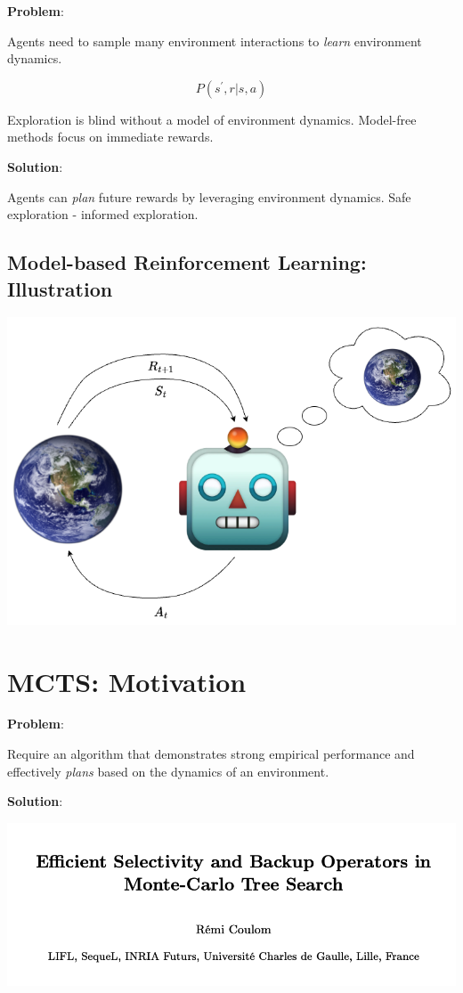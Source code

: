 \documentclass[
  letterpaper,
  DIV=11,
  numbers=noendperiod]{scrreprt}
\begin{document}
\textbf{Problem}:

Agents need to sample many environment interactions to \emph{learn}
environment dynamics.

\[
P(s^{'}, r| s, a)
\]

Exploration is blind without a model of environment dynamics. Model-free
methods focus on immediate rewards.

\textbf{Solution}:

Agents can \emph{plan} future rewards by leveraging environment
dynamics. Safe exploration - informed exploration.

\subsection{Model-based Reinforcement Learning:
Illustration}\label{model-based-reinforcement-learning-illustration}

\includegraphics[width=0.8\linewidth,height=\textheight,keepaspectratio]{lecture11/images/Model-basedRL.png}

\section{MCTS: Motivation}\label{mcts-motivation}

\textbf{Problem}:

Require an algorithm that demonstrates strong empirical performance and
effectively \emph{plans} based on the dynamics of an environment.

\textbf{Solution}:

\includegraphics[width=0.5\linewidth,height=\textheight,keepaspectratio]{lecture11/images/MCTS.png}
\end{document}
